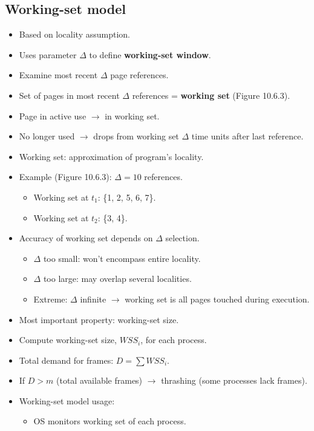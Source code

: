 \subsection{Working-set model}
\begin{itemize}
    \item Based on locality assumption.
    \item Uses parameter $\Delta$ to define \textbf{working-set window}.
    \item Examine most recent $\Delta$ page references.
    \item Set of pages in most recent $\Delta$ references = \textbf{working set} (Figure 10.6.3).
    \item Page in active use $\rightarrow$ in working set.
    \item No longer used $\rightarrow$ drops from working set $\Delta$ time units after last reference.
    \item Working set: approximation of program's locality.
    \item Example (Figure 10.6.3): $\Delta = 10$ references.
    \begin{itemize}
        \item Working set at $t_1$: \{1, 2, 5, 6, 7\}.
        \item Working set at $t_2$: \{3, 4\}.
    \end{itemize}
    \item Accuracy of working set depends on $\Delta$ selection.
    \begin{itemize}
        \item $\Delta$ too small: won't encompass entire locality.
        \item $\Delta$ too large: may overlap several localities.
        \item Extreme: $\Delta$ infinite $\rightarrow$ working set is all pages touched during execution.
    \end{itemize}
    \item Most important property: working-set size.
    \item Compute working-set size, $WSS_i$, for each process.
    \item Total demand for frames: $D = \sum WSS_i$.
    \item If $D > m$ (total available frames) $\rightarrow$ thrashing (some processes lack frames).
    \item Working-set model usage:
    \begin{itemize}
        \item OS monitors working set of each process.

\end{itemize}
\end{itemize}
